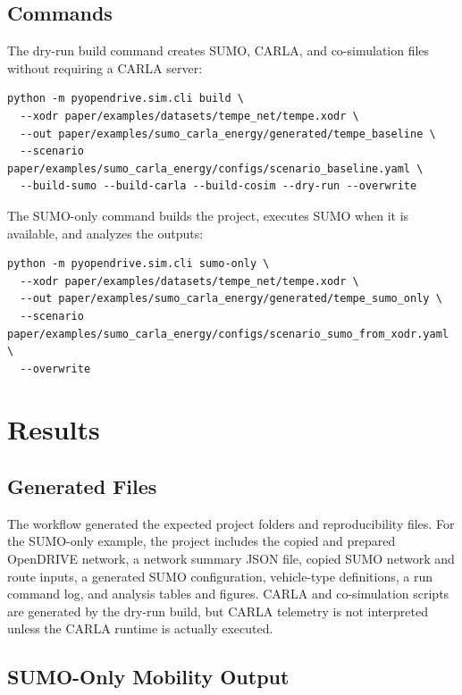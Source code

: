 \documentclass[10pt,numbered]{\selectedmanuscriptclass}
\begin{document}
\subsection{Commands}

The dry-run build command creates SUMO, CARLA, and co-simulation files without
requiring a CARLA server:

\begin{verbatim}
python -m pyopendrive.sim.cli build \
  --xodr paper/examples/datasets/tempe_net/tempe.xodr \
  --out paper/examples/sumo_carla_energy/generated/tempe_baseline \
  --scenario paper/examples/sumo_carla_energy/configs/scenario_baseline.yaml \
  --build-sumo --build-carla --build-cosim --dry-run --overwrite
\end{verbatim}

The SUMO-only command builds the project, executes SUMO when it is available,
and analyzes the outputs:

\begin{verbatim}
python -m pyopendrive.sim.cli sumo-only \
  --xodr paper/examples/datasets/tempe_net/tempe.xodr \
  --out paper/examples/sumo_carla_energy/generated/tempe_sumo_only \
  --scenario paper/examples/sumo_carla_energy/configs/scenario_sumo_from_xodr.yaml \
  --overwrite
\end{verbatim}

\section{Results}\label{sec:results}

\subsection{Generated Files}

The workflow generated the expected project folders and reproducibility files.
For the SUMO-only example, the project includes the copied and prepared
OpenDRIVE network, a network summary JSON file, copied SUMO network and route
inputs, a generated SUMO configuration, vehicle-type definitions, a run command
log, and analysis tables and figures. CARLA and co-simulation scripts are
generated by the dry-run build, but CARLA telemetry is not interpreted unless
the CARLA runtime is actually executed.

\subsection{SUMO-Only Mobility Output}
\end{document}
